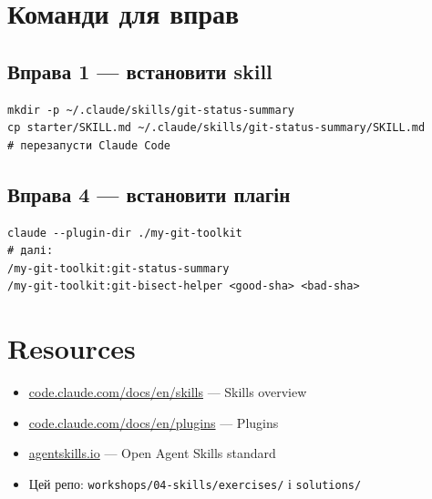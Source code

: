 \documentclass[11pt,a4paper]{article}
\begin{document}
\section{Команди для вправ}

\subsection{Вправа 1 --- встановити skill}

\begin{lstlisting}
mkdir -p ~/.claude/skills/git-status-summary
cp starter/SKILL.md ~/.claude/skills/git-status-summary/SKILL.md
# перезапусти Claude Code
\end{lstlisting}

\subsection{Вправа 4 --- встановити плагін}

\begin{lstlisting}
claude --plugin-dir ./my-git-toolkit
# далі:
/my-git-toolkit:git-status-summary
/my-git-toolkit:git-bisect-helper <good-sha> <bad-sha>
\end{lstlisting}

\section{Resources}

\begin{itemize}
\item \href{https://code.claude.com/docs/en/skills}{code.claude.com/docs/en/skills} --- Skills overview
\item \href{https://code.claude.com/docs/en/plugins}{code.claude.com/docs/en/plugins} --- Plugins
\item \href{https://agentskills.io}{agentskills.io} --- Open Agent Skills standard
\item Цей репо: \texttt{workshops/04-skills/exercises/} і \texttt{solutions/}
\end{itemize}
\end{document}
